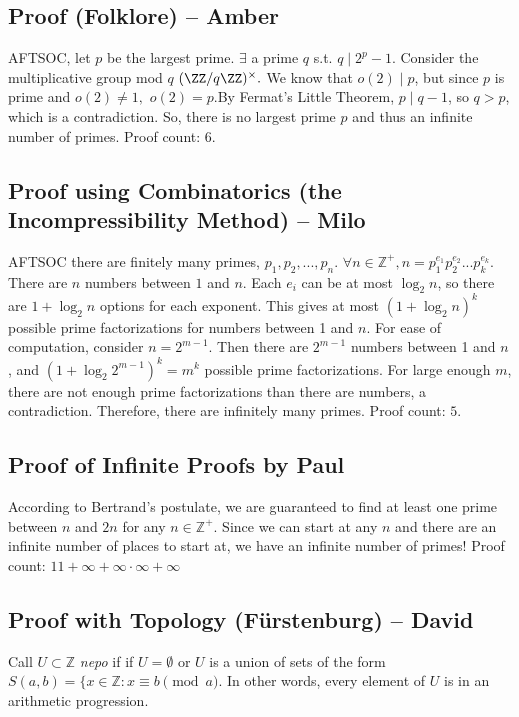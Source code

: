 \documentclass[12pt]{scrartcl}
\begin{document}
\subsection*{Proof (Folklore) -- Amber}
AFTSOC, let $p$ be the largest prime. $\exists$ a prime $q$ s.t. $q\mid{2^p-1}.$
Consider the multiplicative group mod $q$ $(\ZZ/q\ZZ)^\times.$
We know that $o(2)\mid{p}$, but since $p$ is prime and $o(2)\neq{1},$ $o(2)=p$.By Fermat's Little Theorem, $p\mid{q-1}$, so $q>p$, which is a contradiction. So, there is no largest prime $p$ and thus an infinite number of primes. Proof count: $6$.


\subsection*{Proof using Combinatorics (the Incompressibility Method) -- Milo}
AFTSOC there are finitely many primes, $p_1, p_2, ..., p_n$. $\forall n \in \mathbb{Z}^+, n = p_1^{e_1}p_2^{e_2}...p_k^{e_k}$. There are $n$ numbers between $1$ and $n$. Each $e_i$ can be at most $\log_2n$, so there are $1+\log_2n$ options for each exponent. This gives at most $(1+\log_2n)^k$ possible prime factorizations for numbers between 1 and $n$. For ease of computation, consider $n = 2^{m-1}$. Then there are $2^{m-1}$ numbers between 1 and $n$, and $(1+\log_2 2^{m-1})^k = m^k$ possible prime factorizations. For large enough $m$, there are not enough prime factorizations than there are numbers, a contradiction. Therefore, there are infinitely many primes. Proof count: $5$.

\subsection*{Proof of Infinite Proofs by Paul}
According to Bertrand's postulate, we are guaranteed to find at least one prime between $n$ and $2n$ for any $n \in \mathbb{Z}^+$. Since we can start at any $n$ and there are an infinite number of places to start at, we have an infinite number of primes! Proof count: $11+\infty+\infty\cdot\infty+\infty$


\subsection*{Proof with Topology (F\"urstenburg) -- David}
Call $U \subset \mathbb{Z}$ \textit{nepo} if if $U = \emptyset$ or $U$ is a union of sets of the form $S(a, b) = \{ x \in \mathbb{Z} : x \equiv b \pmod{a}$. In other words, every element of $U$ is in an arithmetic progression. \\
\end{document}
